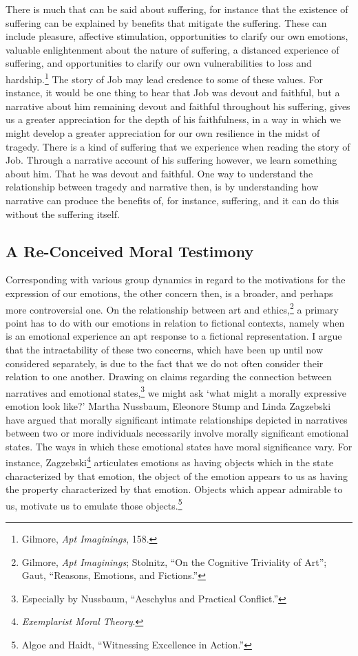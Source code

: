 \documentclass[phdthesis,12pt,final]{wuthesis}
\theoremstyle{definition}
\theoremstyle{definition}
\theoremstyle{definition}
\theoremstyle{definition}
\theoremstyle{remark}
\begin{document}
There is much that can be said about suffering, for instance that the existence of suffering can be explained by benefits that mitigate the suffering. These can include pleasure, affective stimulation, opportunities to clarify our own emotions, valuable enlightenment about the nature of suffering, a distanced experience of suffering, and opportunities to clarify our own vulnerabilities to loss and hardship.\footnote{Gilmore, \emph{Apt {Imaginings}}, 158.} The story of Job may lead credence to some of these values. For instance, it would be one thing to hear that Job was devout and faithful, but a narrative about him remaining devout and faithful throughout his suffering, gives us a greater appreciation for the depth of his faithfulness, in a way in which we might develop a greater appreciation for our own resilience in the midst of tragedy. There is a kind of suffering that we experience when reading the story of Job. Through a narrative account of his suffering however, we learn something about him. That he was devout and faithful. One way to understand the relationship between tragedy and narrative then, is by understanding how narrative can produce the benefits of, for instance, suffering, and it can do this without the suffering itself.

\subsection*{A Re-Conceived Moral Testimony}\label{a-re-conceived-moral-testimony}

Corresponding with various group dynamics in regard to the motivations for the expression of our emotions, the other concern then, is a broader, and perhaps more controversial one. On the relationship between art and ethics,\footnote{Gilmore, \emph{Apt {Imaginings}}; Stolnitz, {``On the {Cognitive Triviality} of {Art}''}; Gaut, {``Reasons, Emotions, and Fictions.''}} a primary point has to do with our emotions in relation to fictional contexts, namely when is an emotional experience an apt response to a fictional representation. I argue that the intractability of these two concerns, which have been up until now considered separately, is due to the fact that we do not often consider their relation to one another. Drawing on claims regarding the connection between narratives and emotional states,\footnote{Especially by Nussbaum, {``Aeschylus and Practical Conflict.''}} we might ask `what might a morally expressive emotion look like?' Martha Nussbaum, Eleonore Stump and Linda Zagzebski have argued that morally significant intimate relationships depicted in narratives between two or more individuals necessarily involve morally significant emotional states. The ways in which these emotional states have moral significance vary. For instance, Zagzebski\footnote{\emph{Exemplarist {Moral Theory}}.} articulates emotions as having objects which in the state characterized by that emotion, the object of the emotion appears to us as having the property characterized by that emotion. Objects which appear admirable to us, motivate us to emulate those objects.\footnote{Algoe and Haidt, {``Witnessing Excellence in Action.''}}
\end{document}
